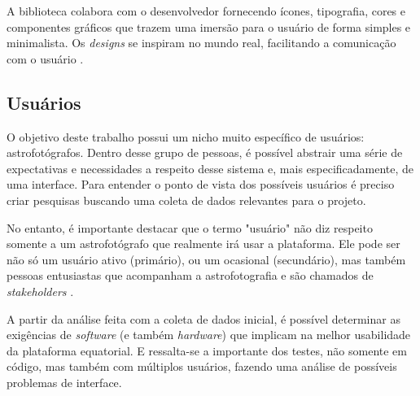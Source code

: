 A biblioteca colabora com o desenvolvedor fornecendo ícones, tipografia, cores e componentes gráficos que trazem uma imersão para o usuário de forma simples e minimalista. Os \textit{designs} se inspiram no mundo real, facilitando a comunicação com o usuário \cite{site:materialdesign}.

\subsection{Usuários}

O objetivo deste trabalho possui um nicho muito específico de usuários: astrofotógrafos. Dentro desse grupo de pessoas, é possível abstrair uma série de expectativas e necessidades a respeito desse sistema e, mais especificadamente, de uma interface. Para entender o ponto de vista dos possíveis usuários é preciso criar pesquisas buscando uma coleta de dados relevantes para o projeto. 

No entanto, é importante destacar que o termo "usuário" não diz respeito somente a um astrofotógrafo que realmente irá usar a plataforma. Ele pode ser não só um usuário ativo (primário), ou um ocasional (secundário), mas também pessoas entusiastas que acompanham a astrofotografia e são chamados de \textit{stakeholders} \cite{BarbosaEtAl2021InteracaoHumanoComputadorExperiencia}.

A partir da análise feita com a coleta de dados inicial, é possível determinar as exigências de \textit{software} (e também \textit{hardware}) que implicam na melhor usabilidade da plataforma equatorial. E ressalta-se a importante dos testes, não somente em código, mas também com múltiplos usuários, fazendo uma análise de possíveis problemas de interface.
